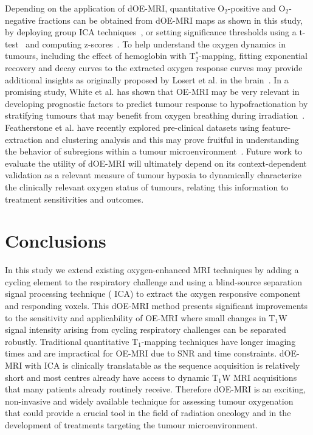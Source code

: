 Depending on the application of \ac{dOE-MRI}, quantitative O$_2$-positive and O$_2$-negative fractions can be obtained from \ac{dOE-MRI} maps as shown in this study, by deploying group \ac{ICA} techniques~\cite{Calhoun:2009jr}, or setting significance thresholds using a t-test~\cite{Greicius:2004ck} and computing z-scores~\cite{McKeown:1998wd}.
To help understand the oxygen dynamics in tumours, including the effect of hemoglobin with T$_2^*$-mapping, fitting exponential recovery and decay curves to the extracted oxygen response curves may provide additional insights as originally proposed by Losert et al. in the brain~\cite{Losert:2002gt}.
In a promising study, White et al. has shown that OE-MRI may be very relevant in developing prognostic factors to predict tumour response to hypofractionation by stratifying tumours that may benefit from oxygen breathing during irradiation~\cite{White:2016fz}.
Featherstone et al. have recently explored pre-clinical datasets using feature-extraction and clustering analysis and this may prove fruitful in understanding the behavior of subregions within a tumour microenvironment~\cite{Featherstone:2018cn}.
Future work to evaluate the utility of \ac{dOE-MRI} will ultimately depend on its context-dependent validation as a relevant measure of tumour hypoxia to dynamically characterize the clinically relevant oxygen status of tumours, relating this information to treatment sensitivities and outcomes.

\section{Conclusions}
In this study we extend existing oxygen-enhanced MRI techniques by adding a cycling element to the respiratory challenge and using a blind-source separation signal processing technique ( \ac{ICA}) to extract the oxygen responsive component and responding voxels.
This \ac{dOE-MRI} method presents significant improvements to the sensitivity and applicability of OE-MRI where small changes in T$_1$W signal intensity arising from cycling respiratory challenges can be separated robustly. Traditional quantitative T$_1$-mapping techniques have longer imaging times and are impractical for OE-MRI due to \ac{SNR} and time constraints.
\ac{dOE-MRI} with \ac{ICA} is clinically translatable as the sequence acquisition is relatively short and most centres already have access to dynamic T$_1$W MRI acquisitions that many patients already routinely receive. 
Therefore \ac{dOE-MRI} is an exciting, non-invasive and widely available technique for assessing tumour oxygenation that could provide a crucial tool in the field of radiation oncology and in the development of treatments targeting the tumour microenvironment.

\endinput

